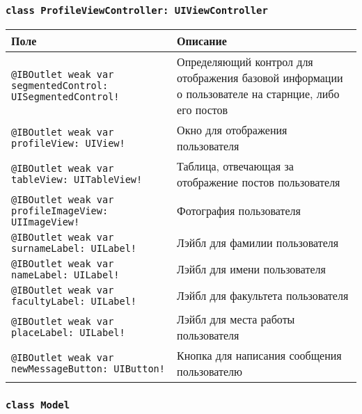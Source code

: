\subsubsection*{\texttt{class ProfileViewController: UIViewController}}

\begin{longtable}{| >{\raggedright\arraybackslash}p{} | p{}|}
\hline
\textbf{Поле} & \textbf{Описание} \\ \hline
\texttt{@IBOutlet weak var segmentedControl: UISegmentedControl!} & {Определяющий контрол для отображения базовой информации о пользователе на старнцие, либо его постов} \\ \hline
\texttt{@IBOutlet weak var profileView: UIView!} & {Окно для отображения пользователя} \\ \hline
\texttt{@IBOutlet weak var tableView: UITableView!} & {Таблица, отвечающая за отображение постов пользователя} \\ \hline
\texttt{@IBOutlet weak var profileImageView: UIImageView!} & {Фотография пользователя} \\ \hline
\texttt{@IBOutlet weak var surnameLabel: UILabel!} & {Лэйбл для фамилии пользователя} \\ \hline
\texttt{@IBOutlet weak var nameLabel: UILabel!} & {Лэйбл для имени пользователя} \\ \hline
\texttt{@IBOutlet weak var facultyLabel: UILabel!} & {Лэйбл для факультета пользователя} \\ \hline
\texttt{@IBOutlet weak var placeLabel: UILabel!} & {Лэйбл для места работы пользователя} \\ \hline
\texttt{@IBOutlet weak var newMessageButton: UIButton!} & {Кнопка для написания сообщения пользователю} \\ \hline

\end{longtable}

\subsubsection*{\texttt{class Model}}


